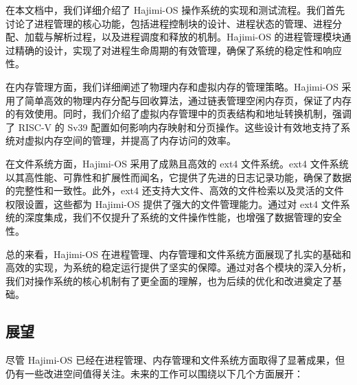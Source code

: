 \documentclass[UTF8]{article}
\begin{document}
在本文档中，我们详细介绍了 Hajimi-OS 操作系统的实现和测试流程。我们首先讨论了进程管理的核心功能，包括进程控制块的设计、进程状态的管理、进程分配、加载与解析过程，以及进程调度和释放的机制。Hajimi-OS 的进程管理模块通过精确的设计，实现了对进程生命周期的有效管理，确保了系统的稳定性和响应性。

在内存管理方面，我们详细阐述了物理内存和虚拟内存的管理策略。Hajimi-OS 采用了简单高效的物理内存分配与回收算法，通过链表管理空闲内存页，保证了内存的有效使用。同时，我们介绍了虚拟内存管理中的页表结构和地址转换机制，强调了 RISC-V 的 Sv39 配置如何影响内存映射和分页操作。这些设计有效地支持了系统对虚拟内存空间的管理，并提高了内存访问的效率。

在文件系统方面，Hajimi-OS 采用了成熟且高效的 ext4 文件系统。ext4 文件系统以其高性能、可靠性和扩展性而闻名，它提供了先进的日志记录功能，确保了数据的完整性和一致性。此外，ext4 还支持大文件、高效的文件检索以及灵活的文件权限设置，这些都为 Hajimi-OS 提供了强大的文件管理能力。通过对 ext4 文件系统的深度集成，我们不仅提升了系统的文件操作性能，也增强了数据管理的安全性。

总的来看，Hajimi-OS 在进程管理、内存管理和文件系统方面展现了扎实的基础和高效的实现，为系统的稳定运行提供了坚实的保障。通过对各个模块的深入分析，我们对操作系统的核心机制有了更全面的理解，也为后续的优化和改进奠定了基础。

\subsection{展望}

尽管 Hajimi-OS 已经在进程管理、内存管理和文件系统方面取得了显著成果，但仍有一些改进空间值得关注。未来的工作可以围绕以下几个方面展开：
\end{document}
